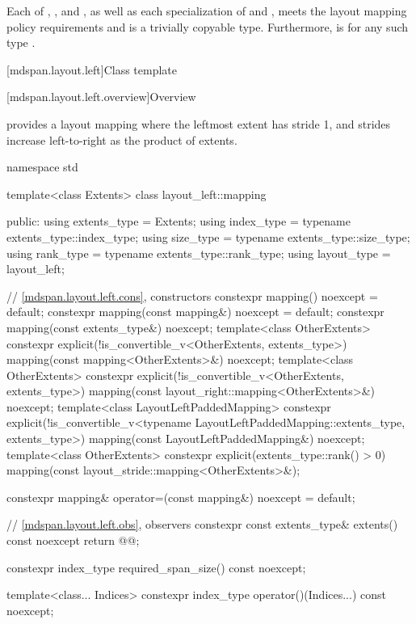 \pnum
Each of , , and ,
as well as each specialization of
 and ,
meets the layout mapping policy requirements and is a trivially copyable type.
Furthermore,
 is 
for any such type .

[mdspan.layout.left]{Class template }

[mdspan.layout.left.overview]{Overview}

\pnum
{} provides a layout mapping
where the leftmost extent has stride 1, and
strides increase left-to-right as the product of extents.

\begin{codeblock}
namespace std {
  template<class Extents>
  class layout_left::mapping {
  public:
    using extents_type = Extents;
    using index_type = typename extents_type::index_type;
    using size_type = typename extents_type::size_type;
    using rank_type = typename extents_type::rank_type;
    using layout_type = layout_left;

    // \ref{mdspan.layout.left.cons}, constructors
    constexpr mapping() noexcept = default;
    constexpr mapping(const mapping&) noexcept = default;
    constexpr mapping(const extents_type&) noexcept;
    template<class OtherExtents>
      constexpr explicit(!is_convertible_v<OtherExtents, extents_type>)
        mapping(const mapping<OtherExtents>&) noexcept;
    template<class OtherExtents>
      constexpr explicit(!is_convertible_v<OtherExtents, extents_type>)
        mapping(const layout_right::mapping<OtherExtents>&) noexcept;
    template<class LayoutLeftPaddedMapping>
      constexpr explicit(!is_convertible_v<typename LayoutLeftPaddedMapping::extents_type,
                                           extents_type>)
        mapping(const LayoutLeftPaddedMapping&) noexcept;
    template<class OtherExtents>
      constexpr explicit(extents_type::rank() > 0)
        mapping(const layout_stride::mapping<OtherExtents>&);

    constexpr mapping& operator=(const mapping&) noexcept = default;

    // \ref{mdspan.layout.left.obs}, observers
    constexpr const extents_type& extents() const noexcept { return @@; }

    constexpr index_type required_span_size() const noexcept;

    template<class... Indices>
      constexpr index_type operator()(Indices...) const noexcept;

}}
\end{codeblock}
